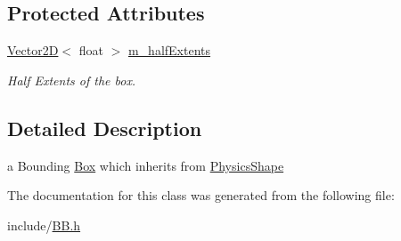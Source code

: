 \subsection*{Protected Attributes}
\begin{DoxyCompactItemize}
\item 
\hypertarget{class_b_b_ac9d77e6dad4861600b9a40fe160e7f83}{\hyperlink{class_vector2_d}{Vector2\+D}$<$ float $>$ \hyperlink{class_b_b_ac9d77e6dad4861600b9a40fe160e7f83}{m\+\_\+half\+Extents}}\label{class_b_b_ac9d77e6dad4861600b9a40fe160e7f83}

\begin{DoxyCompactList}\small\item\em Half Extents of the box. \end{DoxyCompactList}\end{DoxyCompactItemize}


\subsection{Detailed Description}
a Bounding \hyperlink{class_box}{Box} which inherits from \hyperlink{class_physics_shape}{Physics\+Shape} 

The documentation for this class was generated from the following file\+:\begin{DoxyCompactItemize}
\item 
include/\hyperlink{_b_b_8h}{B\+B.\+h}\end{DoxyCompactItemize}
